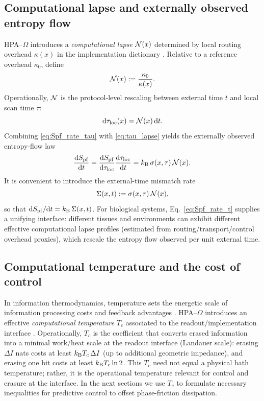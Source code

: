 \subsection{Computational lapse and externally observed entropy flow}
\label{sec:lapse_rescaling}

HPA--$\Omega$ introduces a \emph{computational lapse} $\mathcal{N}(x)$ determined by local routing overhead $\kappa(x)$ in the implementation dictionary \cite{Ma2025CAP,Ma2025FoP,Ma2025CT}.
Relative to a reference overhead $\kappa_0$, define
\begin{equation}
  \mathcal{N}(x) := \frac{\kappa_0}{\kappa(x)}.
  \label{eq:lapse_def}
\end{equation}
Operationally, $\mathcal{N}$ is the protocol-level rescaling between external time $t$ and local scan time $\tau$:
\begin{equation}
  \mathrm{d} \tau_{\mathrm{loc}}(x) = \mathcal{N}(x)\,\mathrm{d} t.
  \label{eq:tau_lapse}
\end{equation}
Combining \eqref{eq:Spf_rate_tau} with \eqref{eq:tau_lapse} yields the externally observed entropy-flow law
\begin{equation}
  \frac{\mathrm{d} S_{\mathrm{pf}}}{\mathrm{d} t}
  = \frac{\mathrm{d} S_{\mathrm{pf}}}{\mathrm{d}\tau_{\mathrm{loc}}}\frac{\mathrm{d}\tau_{\mathrm{loc}}}{\mathrm{d} t}
  = k_{\mathrm{B}}\,\sigma(x,\tau)\,\mathcal{N}(x).
  \label{eq:Spf_rate_t}
\end{equation}
It is convenient to introduce the external-time mismatch rate
\begin{equation}
  \Sigma(x,t) := \sigma(x,\tau)\,\mathcal{N}(x),
  \label{eq:Sigma_def}
\end{equation}
so that $\mathrm{d} S_{\mathrm{pf}}/\mathrm{d} t = k_{\mathrm{B}}\,\Sigma(x,t)$.
For biological systems, Eq.~\eqref{eq:Spf_rate_t} supplies a unifying interface: different tissues and environments can exhibit different effective computational lapse profiles (estimated from routing/transport/control overhead proxies), which rescale the entropy flow observed per unit external time.

\subsection{Computational temperature and the cost of control}
\label{sec:computational_temperature}

In information thermodynamics, temperature sets the energetic scale of information processing costs and feedback advantages \cite{Landauer1961,SagawaUeda2010}.
HPA--$\Omega$ introduces an effective \emph{computational temperature} $T_c$ associated to the readout/implementation interface \cite{Ma2025HPT}.
Operationally, $T_c$ is the coefficient that converts erased information into a minimal work/heat scale at the readout interface (Landauer scale): erasing $\Delta I$ nats costs at least $k_{\mathrm{B}} T_c\,\Delta I$ (up to additional geometric impedance), and erasing one bit costs at least $k_{\mathrm{B}} T_c\ln 2$.
This $T_c$ need not equal a physical bath temperature; rather, it is the operational temperature relevant for control and erasure at the interface.
In the next sections we use $T_c$ to formulate necessary inequalities for predictive control to offset phase-friction dissipation.


